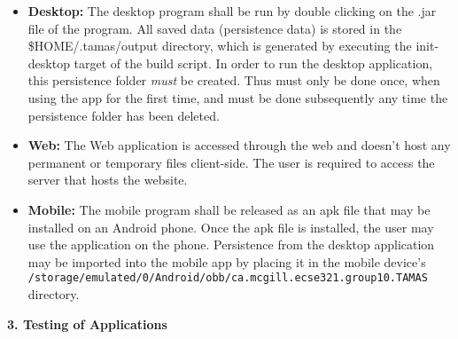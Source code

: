 \documentclass[12pt]{article}
\begin{document}
\begin{itemize}
	\item \textbf{Desktop:} The desktop program shall be run by double clicking on the .jar file of
		the program. All saved data (persistence data) is stored in the \$HOME/.tamas/output
		directory, which is generated by executing the init-desktop target of the build script. In
		order to run the desktop application, this persistence folder \textit{must} be created. Thus
		must only be done once, when using the app for the first time, and must be done subsequently
		any time the persistence folder has been deleted.
	\item \textbf{Web:} The Web application is accessed through the web and doesn't host any permanent or temporary files client-side. The user is required to access the server that hosts the website.
	
	\item \textbf{Mobile:} The mobile program shall be released as an apk file that may be installed
		on an Android phone. Once the apk file is installed, the user may use the application on the
		phone. Persistence from the desktop application may be imported into the mobile app by
		placing it in the mobile device's
		\texttt{/storage/emulated/0/Android/obb/ca.mcgill.ecse321.group10.TAMAS} directory.
\end{itemize}

\textbf{3. Testing of Applications}
\end{document}
